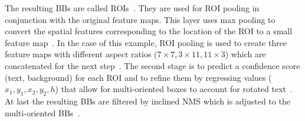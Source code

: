 The resulting \acp{BB} are called \acp{ROI}~\citep{ren_faster_2015,jiang_r2cnn_2017}.
They are used for \ac{ROI} pooling in conjunction with the original feature maps.
This layer uses max pooling to convert the spatial features corresponding to the location of the
\ac{ROI} to a small feature map~\citep{girshick_fast_2015}.
In the case of this example, \ac{ROI} pooling is used to create three feature maps with different
aspect ratios ($7\times7, 3\times11, 11\times3$) which are concatenated for the next
step~\citep{jiang_r2cnn_2017}.
The second stage is to predict a confidence score (text, background) for each \ac{ROI} and to
refine them by regressing values ($x_1,y_1,x_2,y_2,h$) that allow for multi-oriented boxes to account for
rotated text~\citep{jiang_r2cnn_2017}.
At last the resulting \acp{BB} are filtered by inclined \ac{NMS} which is adjusted to the
multi-oriented \acp{BB}~\citep{jiang_r2cnn_2017}.

